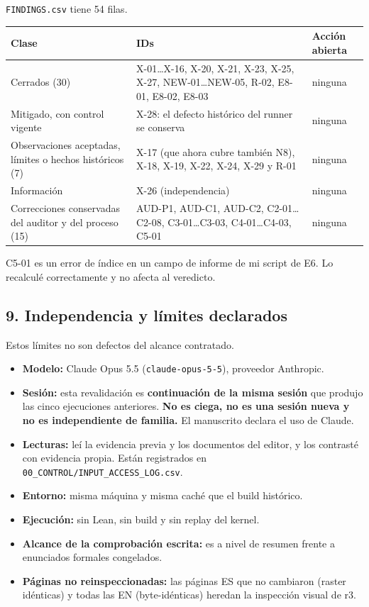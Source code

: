 \documentclass[
]{article}
\newcounter{none} %
\providecommand{\tightlist}{%
  \setlength{\itemsep}{0pt}\setlength{\parskip}{0pt}}
\begin{document}
\texttt{FINDINGS.csv} tiene 54 filas.

{\def\LTcaptype{none} %
\begin{longtable}[]{@{}lll@{}}
\toprule\noalign{}
Clase & IDs & Acción abierta \\
\midrule\noalign{}
\endhead
\bottomrule\noalign{}
\endlastfoot
Cerrados (30) & X-01\ldots X-16, X-20, X-21, X-23, X-25, X-27,
NEW-01\ldots NEW-05, R-02, E8-01, E8-02, E8-03 & ninguna \\
Mitigado, con control vigente & X-28: el defecto histórico del runner se
conserva & ninguna \\
Observaciones aceptadas, límites o hechos históricos (7) & X-17 (que
ahora cubre también N8), X-18, X-19, X-22, X-24, X-29 y R-01 &
ninguna \\
Información & X-26 (independencia) & ninguna \\
Correcciones conservadas del auditor y del proceso (15) & AUD-P1,
AUD-C1, AUD-C2, C2-01\ldots C2-08, C3-01\ldots C3-03, C4-01\ldots C4-03,
C5-01 & ninguna \\
\end{longtable}
}

C5-01 es un error de índice en un campo de informe de mi script de E6.
Lo recalculé correctamente y no afecta al veredicto.

\subsection{9. Independencia y límites
declarados}\label{9-independencia-y-luxedmites-declarados}

Estos límites no son defectos del alcance contratado.

\begin{itemize}
\tightlist
\item
  \textbf{Modelo:} Claude Opus 5.5 (\texttt{claude-opus-5-5}), proveedor
  Anthropic.
\item
  \textbf{Sesión:} esta revalidación es \textbf{continuación de la misma
  sesión} que produjo las cinco ejecuciones anteriores. \textbf{No es
  ciega, no es una sesión nueva y no es independiente de familia.} El
  manuscrito declara el uso de Claude.
\item
  \textbf{Lecturas:} leí la evidencia previa y los documentos del
  editor, y los contrasté con evidencia propia. Están registrados en
  \texttt{00\_CONTROL/INPUT\_ACCESS\_LOG.csv}.
\item
  \textbf{Entorno:} misma máquina y misma caché que el build histórico.
\item
  \textbf{Ejecución:} sin Lean, sin build y sin replay del kernel.
\item
  \textbf{Alcance de la comprobación escrita:} es a nivel de resumen
  frente a enunciados formales congelados.
\item
  \textbf{Páginas no reinspeccionadas:} las páginas ES que no cambiaron
  (raster idénticas) y todas las EN (byte-idénticas) heredan la
  inspección visual de r3.
\end{itemize}
\end{document}

